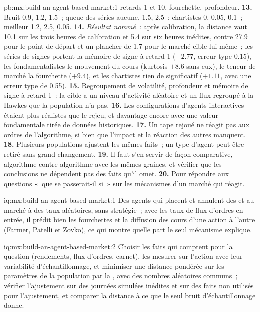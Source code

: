 \begin{solution}{pb:mx:build-an-agent-based-market:1}
retards 1 et 10, fourchette, profondeur.
\textbf{13.} Bruit 0.9, 1.2, 1.5~; queue des séries aucune, 1.5, 2.5~; chartistes 0, 0.05, 0.1~; meilleur 1.2, 2.5, 0.05.
\textbf{14.} \emph{Résultat nommé}~: après calibration, la distance vaut 10.1 sur les trois heures de calibration et 5.4 sur six heures inédites, contre 27.9 pour
le point de départ et un plancher de 1.7 pour le marché cible lui-même~; les séries de signes portent la mémoire de signe à retard 1 ($-2.77$, erreur type 0.15), les fondamentalistes le
mouvement du cours (kurtosis $+8.6$ sans eux), le teneur de marché la fourchette ($+9.4$), et les chartistes rien de significatif ($+1.11$, avec une erreur type de 0.55).
\textbf{15.} Regroupement de volatilité, profondeur et mémoire de signe à retard 1~: la cible a un niveau d'activité aléatoire et un flux regroupé à la Hawkes que la population n'a pas.
\textbf{16.} Les configurations d'agents interactives étaient plus réalistes que le rejeu, et davantage encore avec une valeur fondamentale tirée de données historiques.
\textbf{17.} Un tape rejoué ne réagit pas aux ordres de l'algorithme, si bien que l'impact et la réaction des autres manquent.
\textbf{18.} Plusieurs populations ajustent les mêmes faits~; un type d'agent peut être retiré sans grand changement.
\textbf{19.} Il faut s'en servir de façon comparative, algorithme contre algorithme avec les mêmes graines, et vérifier que les conclusions ne dépendent pas des faits qu'il omet.
\textbf{20.} Pour répondre aux questions «~que se passerait-il si~» sur les mécanismes d'un marché qui réagit.
\end{solution}

\begin{solution}{iq:mx:build-an-agent-based-market:1}
Des agents qui placent et annulent des  et au marché à des taux aléatoires, sans stratégie~; avec les taux de flux d'ordres en entrée, il prédit bien les fourchettes et
la diffusion des cours d'une action à l'autre (Farmer, Patelli et Zovko), ce qui montre quelle part le seul mécanisme explique.
\end{solution}

\begin{solution}{iq:mx:build-an-agent-based-market:2}
Choisir les faits qui comptent pour la question (rendements, flux d'ordres, carnet), les mesurer sur l'action avec leur variabilité d'échantillonnage, et minimiser une
distance pondérée sur les paramètres de la population par la , avec des nombres aléatoires communs~; vérifier l'ajustement sur des journées simulées inédites et sur
des faits non utilisés pour l'ajustement, et comparer la distance à ce que le seul bruit d'échantillonnage donne.
\end{solution}

